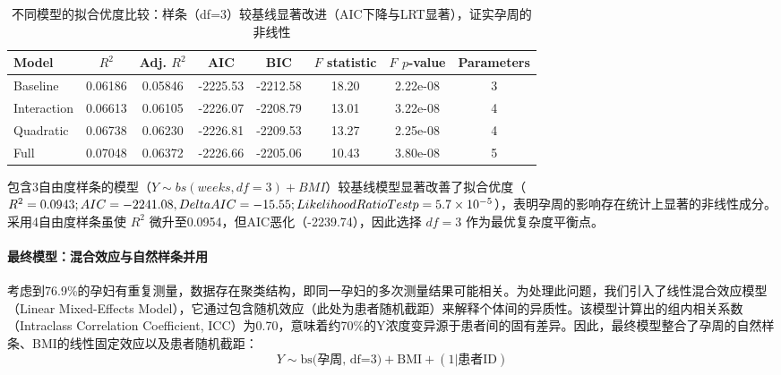\documentclass[withoutpreface]{cumcmthesis}
\begin{document}
\begin{table}[htbp]
    \centering
    \setlength{\tabcolsep}{4pt}
    \caption{不同模型的拟合优度比较：样条（df=3）较基线显著改进（AIC下降与LRT显著），证实孕周的非线性}
    \label{tab:model_comparison}
    \begin{tabular}{l
				S[table-format=1.5]
				S[table-format=1.5]
				S[table-format=-4.4]
				S[table-format=-4.4]
				S[table-format=2.5]
				S[table-format=1.2e-2]
				c}
\toprule
        Model & {$R^2$} & {Adj. $R^2$} & {AIC} & {BIC} & {$F$ statistic} & {$F$ $p$-value} & {Parameters} \\
        \midrule
        Baseline    & 0.06186 & 0.05846 & -2225.53 & -2212.58 & 18.20 & 2.22e-08 & 3 \\
        Interaction & 0.06613 & 0.06105 & -2226.07 & -2208.79 & 13.01 & 3.22e-08 & 4 \\
        Quadratic   & 0.06738 & 0.06230 & -2226.81 & -2209.53 & 13.27 & 2.25e-08 & 4 \\
        Full        & 0.07048 & 0.06372 & -2226.66 & -2205.06 & 10.43 & 3.80e-08 & 5 \\
        \bottomrule
    \end{tabular}
\end{table}

包含3自由度样条的模型（$Y \sim bs(weeks, df=3) + BMI$）较基线模型显著改善了拟合优度（$R^2 = 0.0943; AIC = -2241.08, \\Delta AIC = -15.55; Likelihood Ratio Test\\ p = 5.7\times 10^{-5}$），表明孕周的影响存在统计上显著的非线性成分。采用4自由度样条虽使 $R^2$ 微升至0.0954，但AIC恶化（-2239.74），因此选择 $df=3$ 作为最优复杂度平衡点。

\paragraph{最终模型：混合效应与自然样条并用}
考虑到76.9\%的孕妇有重复测量，数据存在聚类结构，即同一孕妇的多次测量结果可能相关。为处理此问题，我们引入了线性混合效应模型（Linear Mixed-Effects Model），它通过包含随机效应（此处为患者随机截距）来解释个体间的异质性。该模型计算出的组内相关系数（Intraclass Correlation Coefficient, ICC）为0.70，意味着约70\%的Y浓度变异源于患者间的固有差异。因此，最终模型整合了孕周的自然样条、BMI的线性固定效应以及患者随机截距：
\begin{equation*}
Y \sim \text{bs(孕周, df=3)} + \text{BMI} + (1|\text{患者ID})
\end{equation*}
\end{document}
